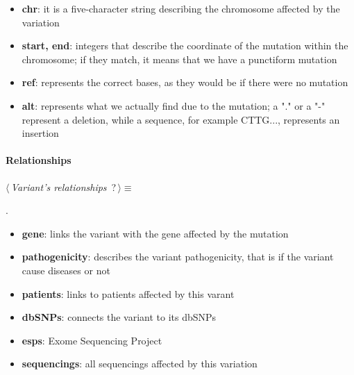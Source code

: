 \newpage

\begin{itemize}
	\item \textbf{chr}: it is a five-character string describing the chromosome affected by the variation
 	\item \textbf{start, end}:  integers that describe the coordinate of the mutation within the chromosome; if they match, it means that we have a punctiform mutation
	\item \textbf{ref}: represents the correct bases, as they would be if there were no mutation
   	\item \textbf{alt}: represents what we actually find due to the mutation; a "." or a "-" represent a deletion, while a sequence, for example CTTG..., represents an insertion
\end{itemize}

\newpage

\paragraph{Relationships}  

	\begin{flushleft} \small
\begin{minipage}{\linewidth}\label{scrap3}\raggedright\small
{} $\langle\,${\itshape {Variant's relationships}}\nobreak\ {\footnotesize {?}}$\,\rangle\equiv$
\vspace{-1ex}
\begin{list}{}{} \item

                
        {\NWsep}
\end{list}
\vspace{-1.5ex}
\footnotesize
\begin{list}{}{\setlength{\itemsep}{-\parsep}\setlength{\itemindent}{-\leftmargin}}
\item {\NWtxtMacroNoRef}.

\item{}
\end{list}
\end{minipage}\vspace{4ex}
\end{flushleft}
\begin{itemize}
	\item \textbf{gene}: links the variant with the gene affected by the mutation
	\item \textbf{pathogenicity}: describes the variant pathogenicity, that is if the variant cause diseases or not
  	\item \textbf{patients}: links to patients affected by this varant
  	\item \textbf{dbSNPs}: connects the variant to its dbSNPs
  	\item \textbf{esps}: Exome Sequencing Project
  	\item \textbf{sequencings}: all sequencings affected by this variation
\end{itemize}


